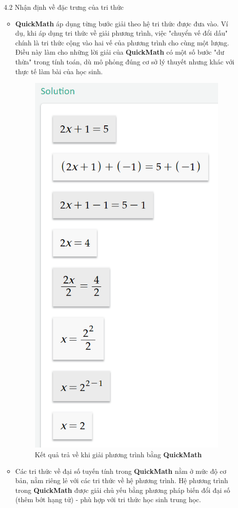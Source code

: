 \documentclass[a4paper]{article}
\begin{document}
\begin{enumerate}
\item [4.2]Nhận định về đặc trưng của tri thức
\begin{itemize}
\item \textbf{QuickMath} áp dụng từng bước giải theo hệ tri thức được đưa vào. Ví dụ, khi áp dụng tri thức về giải phương trình, việc "chuyển vế đổi dấu" chính là tri thức cộng vào hai vế của phương trình cho cùng một lượng. Điều này làm cho những lời giải của \textbf{QuickMath} có một số bước "dư thừa" trong tính toán, dù mô phỏng đúng cơ sở lý thuyết nhưng khác với thực tế làm bài của học sinh. 
\begin{figure}
	\centering
	\includegraphics[width=0.7\linewidth]{quickmath2}
	\caption{Kết quả trả về khi giải phương trình bằng \textbf{QuickMath}}
	\label{fig:quickmath2}
\end{figure}
\item Các tri thức về đại số tuyến tính trong \textbf{QuickMath} nằm ở mức độ cơ bản, nằm riêng lẻ với các tri thức về hệ phương trình. Hệ phương trình trong \textbf{QuickMath} được giải chủ yếu bằng phương pháp biến đổi đại số (thêm bớt hạng tử) - phù hợp với tri thức học sinh trung học.

\end{itemize}
\end{enumerate}
\end{document}
